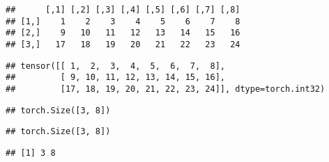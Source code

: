 \documentclass[]{book}
\newenvironment{Shaded}{\begin{snugshade}}{\end{snugshade}}
\newcommand{\KeywordTok}[1]{\textcolor[rgb]{0.13,0.29,0.53}{\textbf{#1}}}
\newcommand{\NormalTok}[1]{#1}
\newcommand{\OperatorTok}[1]{\textcolor[rgb]{0.81,0.36,0.00}{\textbf{#1}}}
\newcommand{\StringTok}[1]{\textcolor[rgb]{0.31,0.60,0.02}{#1}}
\begin{document}
\begin{verbatim}
##      [,1] [,2] [,3] [,4] [,5] [,6] [,7] [,8]
## [1,]    1    2    3    4    5    6    7    8
## [2,]    9   10   11   12   13   14   15   16
## [3,]   17   18   19   20   21   22   23   24
\end{verbatim}

\begin{Shaded}
\end{Shaded}

\begin{verbatim}
## tensor([[ 1,  2,  3,  4,  5,  6,  7,  8],
##         [ 9, 10, 11, 12, 13, 14, 15, 16],
##         [17, 18, 19, 20, 21, 22, 23, 24]], dtype=torch.int32)
\end{verbatim}

\begin{Shaded}
\end{Shaded}

\begin{verbatim}
## torch.Size([3, 8])
\end{verbatim}

\begin{Shaded}
\end{Shaded}

\begin{verbatim}
## torch.Size([3, 8])
\end{verbatim}

\begin{Shaded}
\end{Shaded}

\begin{verbatim}
## [1] 3 8
\end{verbatim}
\end{document}
